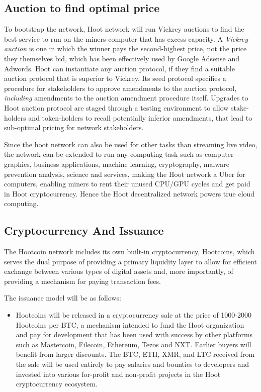\documentclass{article}
\begin{document}
\subsection{Auction to find optimal price}
To bootstrap the network, Hoot network will run Vickrey auctions to find the best service to run on the miners computer that has excess capacity. A \emph{Vickrey auction} is one in which the winner pays the second-highest price, not the price they themselves bid, which has been effectively used by Google Adsense and Adwords.
Hoot can instantiate any auction protocol, if they find a suitable auction protocol that is superior to Vickrey. Its seed protocol specifies a procedure for stakeholders to approve amendments to the auction protocol,
\emph{including} amendments to the auction amendment procedure itself. Upgrades to Hoot auction protocol are staged through a testing environment to allow stake-holders and token-holders to recall potentially inferior amendments, that lead to sub-optimal pricing for network stakeholders. 

Since the hoot network can also be used for other tasks than streaming live video, the network can be extended to run any computing task such as computer graphics, business applications, machine learning, cryptography, malware prevention analysis, science and services, making the Hoot network a Uber for computers, enabling miners to rent their unused CPU/GPU cycles and get paid in Hoot cryptocurrency. Hence the Hoot decentralized network powers true cloud computing.

\subsection{Cryptocurrency And Issuance}

The Hootcoin network includes its own built-in cryptocurrency, Hootcoins, which serves the dual purpose of providing a primary liquidity layer to allow for efficient exchange between various types of digital assets and, more importantly, of providing a mechanism for paying transaction fees.

The issuance model will be as follows:

\begin{itemize}

\item Hootcoins will be released in a cryptocurrency sale at the price of 1000-2000 Hootcoins per BTC, a mechanism intended to fund the Hoot organization and pay for development that has been used with success by other platforms such as Mastercoin, Filecoin, Ethereum, Tezos and NXT. Earlier buyers will benefit from larger discounts. The BTC, ETH, XMR, and LTC received from the sale will be used entirely to pay salaries and bounties to developers and invested into various for-profit and non-profit projects in the Hoot cryptocurrency ecosystem.

\end{itemize}
\end{document}

